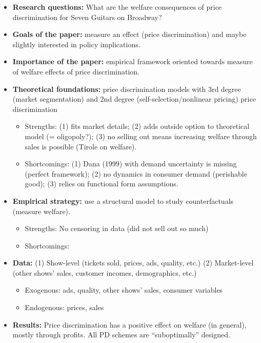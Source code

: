 \begin{itemize}
\item \textbf{Research questions:} What are the welfare consequences of price discrimination for Seven Guitars on Broadway?
\item \textbf{Goals of the paper:} measure an effect (price discrimination) and maybe slightly interested in policy implications.
\item \textbf{Importance of the paper:} empirical framework oriented towards measure of welfare effects of price discrimination.
\item \textbf{Theoretical foundations:} price discrimination models with 3rd degree (market segmentation) and 2nd degree (self-selection/nonlinear pricing) price discrimination  \begin{itemize}
\item Strengths: (1) fits market details; (2) adds outside option to theoretical model (= oligopoly?); (3) no selling out means increasing welfare through sales is possible (Tirole on welfare).
\item Shortcomings: (1) Dana (1999) with demand uncertainty is missing (perfect framework); (2) no dynamics in consumer demand (perishable good); (3) relies on functional form assumptions.
\end{itemize}
\item \textbf{Empirical strategy:} use a structural model to study counterfactuals (measure welfare).\begin{itemize}
\item Strengths: No censoring in data (did not sell out so much)
\item Shortcomings: 
\end{itemize}
\item \textbf{Data:} (1) Show-level (tickets sold, prices, ads, quality, etc.) (2) Market-level (other shows' sales, customer incomes, demographics, etc.)
\begin{itemize}
\item Exogenous: ads, quality, other shows' sales, consumer variables
\item Endogenous: prices, sales
\end{itemize}
\item \textbf{Results:} Price discrimination has a positive effect on welfare (in general), mostly through profits. All PD schemes are ``suboptimally'' designed.
\end{itemize}
